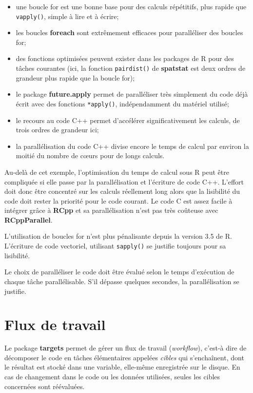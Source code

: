 \documentclass[
  12pt,
  french,
  a4paper,
  extrafontsizes,onecolumn,openright
  ]{memoir}
\providecommand{\tightlist}{%
  \setlength{\itemsep}{0pt}\setlength{\parskip}{0pt}}
\begin{document}
\begin{itemize}
\tightlist
\item
  une boucle for est une bonne base pour des calculs répétitifs, plus rapide que \texttt{vapply()}, simple à lire et à écrire;
\item
  les boucles \textbf{foreach} sont extrêmement efficaces pour paralléliser des boucles for;
\item
  des fonctions optimisées peuvent exister dans les packages de R pour des tâches courantes (ici, la fonction \texttt{pairdist()} de \textbf{spatstat} est deux ordres de grandeur plus rapide que la boucle for);
\item
  le package \textbf{future.apply} permet de paralléliser très simplement du code déjà écrit avec des fonctions \texttt{*apply()}, indépendamment du matériel utilisé;
\item
  le recours au code C++ permet d'accélérer significativement les calculs, de trois ordres de grandeur ici;
\item
  la parallélisation du code C++ divise encore le temps de calcul par environ la moitié du nombre de cœurs pour de longs calculs.
\end{itemize}

Au-delà de cet exemple, l'optimisation du temps de calcul sous R peut être compliquée si elle passe par la parallélisation et l'écriture de code C++.
L'effort doit donc être concentré sur les calculs réellement long alors que la lisibilité du code doit rester la priorité pour le code courant.
Le code C est assez facile à intégrer grâce à \textbf{RCpp} et sa parallélisation n'est pas très coûteuse avec \textbf{RCppParallel}.

L'utilisation de boucles for n'est plus pénalisante depuis la version 3.5 de R.
L'écriture de code vectoriel, utilisant \texttt{sapply()} se justifie toujours pour sa lisibilité.

Le choix de paralléliser le code doit être évalué selon le temps d'exécution de chaque tâche parallélisable.
S'il dépasse quelques secondes, la parallélisation se justifie.

\section{Flux de travail}\label{sec:targets}

Le package \textbf{targets} permet de gérer un flux de travail (\emph{workflow}), c'est-à dire de décomposer le code en tâches élémentaires appelées \emph{cibles} qui s'enchaînent, dont le résultat est stocké dans une variable, elle-même enregistrée sur le disque.
En cas de changement dans le code ou les données utilisées, seules les cibles concernées sont réévaluées.
\end{document}
